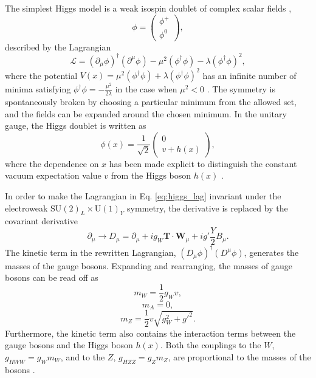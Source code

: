 The simplest Higgs model is a weak isospin doublet of complex scalar fields \cite{Thomson:2013zua},
\begin{equation}
\phi = \begin{pmatrix} \phi^+ \\ \phi^0 \end{pmatrix},
\end{equation}
described by the Lagrangian
\begin{equation}
\mathcal{L} = (\partial_\mu \phi)^\dag (\partial^\mu \phi) - \mu^2(\phi^\dag\phi) - \lambda(\phi^\dag \phi)^2,
\label{eq:higgs_lag}
\end{equation}
where the potential $V(x) = \mu^2(\phi^\dag\phi) + \lambda(\phi^\dag \phi)^2$
has an infinite number of minima satisfying $\phi^\dag \phi = -\frac{\mu^2}{2\lambda}$
in the case when $\mu^2 < 0$ \cite{Thomson:2013zua}. The symmetry is spontaneously broken by choosing a
particular minimum from the allowed set, and the fields can be expanded around the chosen minimum.
In the unitary gauge, the Higgs doublet is written as
\begin{equation}
\phi(x) = \frac{1}{\sqrt{2}} \begin{pmatrix} 0 \\ v + h(x) \end{pmatrix},
\end{equation}
where the dependence on $x$ has been made explicit to distinguish the constant
vacuum expectation value $v$ from the Higgs boson $h(x)$ \cite{Thomson:2013zua}.

In order to make the Lagrangian in Eq. \ref{eq:higgs_lag} invariant under the electroweak
$\text{SU}(2)_L \times \text{U}(1)_Y$ symmetry, the derivative is replaced by the covariant
derivative \cite{Thomson:2013zua}
\begin{equation}
\partial_\mu \rightarrow D_\mu = \partial_\mu + i g_W \mathbf{T} \cdot \mathbf{W}_\mu
+ i g' \frac{Y}{2} B_\mu.
\end{equation}
The kinetic term in the rewritten Lagrangian, $(D_\mu \phi)^\dag (D^\mu \phi)$, generates the
masses of the gauge bosons. Expanding and rearranging, the masses of gauge bosons can be read off as
\begin{equation}
m_W = \frac{1}{2} g_W v,
\end{equation}
\begin{equation}
m_A = 0,
\end{equation}
\begin{equation}
m_Z = \frac{1}{2}v\sqrt{g_W^2 + g'^2}.
\end{equation}
Furthermore, the kinetic term also contains the interaction terms between the gauge bosons
and the Higgs boson $h(x)$. Both the couplings to the $W$, $g_{HWW}=g_W m_W$, and to the $Z$,
$g_{HZZ} = g_Z m_Z$, are proportional to the masses of the bosons \cite{Thomson:2013zua}.

